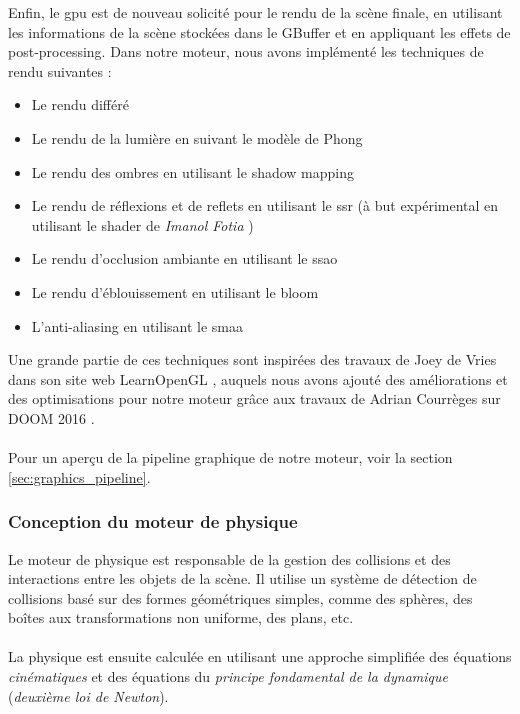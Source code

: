     \newpage
    Enfin, le \gls{gpu} est de nouveau solicité pour le rendu de la scène
    finale, en utilisant les informations de la scène stockées dans le
    \gls{GBuffer} et en appliquant les effets de post-processing.
    Dans notre moteur, nous avons implémenté les techniques de rendu suivantes :
    \begin{multicols}{2}
    \begin{itemize}
        \item Le rendu différé
        \item Le rendu de la lumière en suivant le modèle de Phong 
        \item Le rendu des ombres en utilisant le \gls{shadow mapping}
        \item Le rendu de réflexions et de reflets en utilisant le \gls{ssr} (à but expérimental en utilisant le \gls{shader} de \emph{Imanol Fotia} \cite{imanolfotia})
        \item Le rendu d'occlusion ambiante en utilisant le \gls{ssao}
        \item Le rendu d'éblouissement en utilisant le \gls{bloom}
        \item L'anti-aliasing en utilisant le \gls{smaa}
    \end{itemize}
    \end{multicols}

    Une grande partie de ces techniques sont inspirées des travaux de Joey de Vries
    dans son site web LearnOpenGL \cite{learnopengl}, auquels nous avons
    ajouté des améliorations et des optimisations pour notre moteur grâce
    aux travaux de Adrian Courrèges sur DOOM 2016 \cite{courreges_doom2016}.
    \\ \\
    Pour un aperçu de la pipeline graphique de notre moteur, voir la section
    \ref{sec:graphics_pipeline}.

\subsubsection{Conception du moteur de physique}

    Le moteur de physique est responsable de la gestion des collisions et
    des interactions entre les objets de la scène. Il utilise un système de
    détection de collisions basé sur des formes géométriques simples, comme
    des sphères, des boîtes aux transformations non uniforme, des plans, etc.
    \\ \\
    La physique est ensuite calculée en utilisant une approche simplifiée des
    équations \emph{cinématiques} et des équations du \emph{principe fondamental de la dynamique}
    (\emph{deuxième loi de Newton}).

